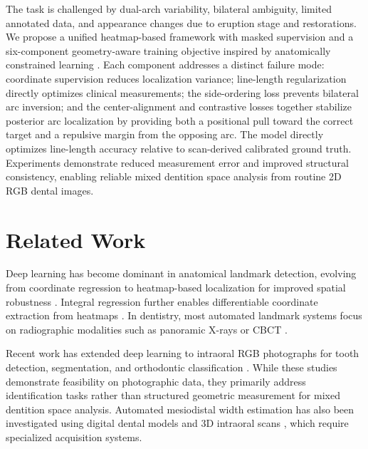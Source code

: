\documentclass[conference]{IEEEtran}
\begin{document}
The task is challenged by dual-arch variability, bilateral ambiguity, limited annotated data,
and appearance changes due to eruption stage and restorations. We propose a unified
heatmap-based framework with masked supervision and a six-component geometry-aware training
objective inspired by anatomically constrained learning \cite{oktay2018anatomically}. Each
component addresses a distinct failure mode: coordinate supervision reduces localization
variance; line-length regularization directly optimizes clinical measurements; the
side-ordering loss prevents bilateral arc inversion; and the center-alignment and contrastive
losses together stabilize posterior arc localization by providing both a positional pull toward
the correct target and a repulsive margin from the opposing arc. The model directly optimizes
line-length accuracy relative to scan-derived calibrated ground truth. Experiments demonstrate
reduced measurement error and improved structural consistency, enabling reliable mixed dentition
space analysis from routine 2D RGB dental images.

\section{Related Work}

Deep learning has become dominant in anatomical landmark detection, evolving from coordinate
regression to heatmap-based localization for improved spatial robustness
\cite{newell2016stacked,payer2016regressing}. Integral regression further enables differentiable
coordinate extraction from heatmaps \cite{sun2018integral}. In dentistry, most automated
landmark systems focus on radiographic modalities such as panoramic X-rays or CBCT
\cite{wang2016benchmark,schwendicke2019deep}.

Recent work has extended deep learning to intraoral RGB photographs for tooth detection,
segmentation, and orthodontic classification
\cite{ghorbani2025automated,kartbak2025classification,koch2026angleclassification,nguyen2025segmentanytooth}.
While these studies demonstrate feasibility on photographic data, they primarily address
identification tasks rather than structured geometric measurement for mixed dentition space
analysis. Automated mesiodistal width estimation has also been investigated using digital dental
models and 3D intraoral scans \cite{im2022toothsegmentation}, which require specialized
acquisition systems.
\end{document}
